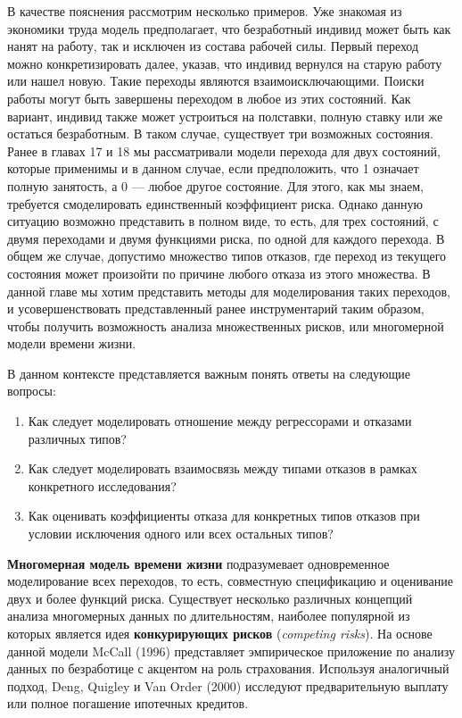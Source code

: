 В качестве пояснения рассмотрим несколько примеров. Уже знакомая из экономики труда модель предполагает, что безработный индивид может быть как нанят на работу, так и исключен из состава рабочей силы. Первый переход можно конкретизировать далее, указав, что индивид вернулся на старую работу или нашел новую. Такие переходы являются взаимоисключающими. Поиски работы могут быть завершены переходом в любое из этих состояний. Как вариант, индивид также может устроиться на полставки, полную ставку или же остаться безработным. В таком случае, существует три возможных состояния. Ранее в главах 17 и 18 мы рассматривали модели перехода для двух состояний, которые применимы и в данном случае, если предположить, что 1 означает полную занятость, а 0 --- любое другое состояние. Для этого, как мы знаем, требуется смоделировать единственный коэффициент риска. Однако данную ситуацию возможно представить в полном виде, то есть, для трех состояний, с двумя переходами и двумя функциями риска, по одной для каждого перехода. В общем же случае, допустимо множество типов отказов, где переход из текущего состояния может произойти по причине любого отказа из этого множества. В данной главе мы хотим представить методы для моделирования таких переходов, и усовершенствовать представленный ранее инструментарий таким образом, чтобы получить возможность анализа множественных рисков, или многомерной модели времени жизни.

В данном контексте представляется важным понять ответы на следующие вопросы:
\begin{enumerate}
\item Как следует моделировать отношение между регрессорами и отказами различных типов?
\item Как следует моделировать взаимосвязь между типами отказов в рамках конкретного исследования?
\item Как оценивать коэффициенты отказа для конкретных типов отказов при условии исключения одного или всех остальных типов?
\end{enumerate}

\textbf{Многомерная модель времени жизни} подразумевает одновременное моделирование всех переходов, то есть, совместную спецификацию и оценивание двух и более функций риска. Существует несколько различных концепций анализа многомерных данных по длительностям, наиболее популярной из которых является идея \textbf{конкурирующих рисков} (\textit{competing risks}). На основе данной модели McCall (1996) представляет эмпирическое приложение по анализу данных по безработице с акцентом на роль страхования. Используя аналогичный подход, Deng, Quigley и Van Order (2000) исследуют предварительную выплату или полное погашение ипотечных кредитов.

